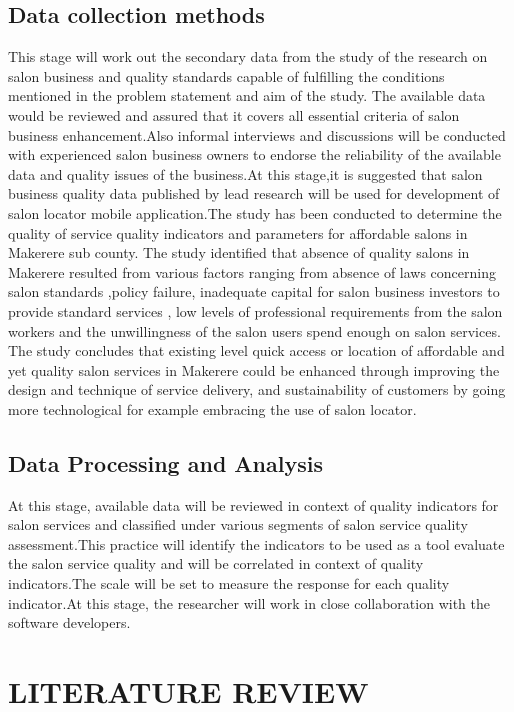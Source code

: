 \documentclass[11pt]{article}
\begin{document}
\subsection{Data collection methods}
This stage will work out the secondary data from the study of the research on salon business and quality standards\cite{sachdev2004relative} capable of fulfilling the conditions mentioned in the problem statement and aim of the study.
The available data would be reviewed and assured that it covers all essential criteria of salon business enhancement.Also informal interviews and discussions will be conducted with experienced salon business owners to endorse the reliability of the available data and quality issues of the business.At this stage,it is suggested that salon business quality data published by lead research will be used for development of salon locator mobile application.The study has been conducted to determine the quality of service quality indicators and parameters for affordable salons in Makerere sub county. 
   The study identified that absence of quality salons in Makerere resulted from various factors ranging from absence of laws concerning salon standards ,policy failure, inadequate capital for salon business investors to provide standard services , low levels of professional requirements from the salon workers and the unwillingness of the salon users spend enough on salon services.
The study concludes that existing level quick access or location of affordable and yet quality salon services in Makerere could be enhanced through improving the design and technique of service delivery, and sustainability of customers by going more technological for example embracing the use of salon locator.

\subsection{Data Processing and Analysis}
At this stage, available data will be reviewed in context of quality indicators for salon services and classified under various segments of salon service quality assessment.This practice will identify the indicators to be used as a tool evaluate the salon service quality and will be correlated in context of quality indicators.The scale will be set to measure the response for each quality indicator.At this stage, the researcher will work in close collaboration with the software developers.\cite{cai2015challenges}

 \section{LITERATURE REVIEW}
\end{document}
